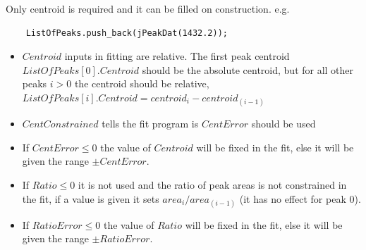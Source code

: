 \documentclass[a4paper,10pt]{article}
\begin{document}
Only centroid is required and it can be filled on construction. e.g.
\lstset{language=C++}
\begin{lstlisting}
	ListOfPeaks.push_back(jPeakDat(1432.2));
\end{lstlisting}

\begin{itemize}
\item $Centroid$ inputs in fitting are relative. The first peak centroid $ListOfPeaks[0].Centroid$ should be the absolute centroid, but for all other peaks $i>0$ the centroid should be relative, \\$ListOfPeaks[i].Centroid = centroid_i - centroid_{(i-1)}$
\item $CentConstrained$ tells the fit program is $CentError$ should be used
\item If $CentError\leq0$ the value of $Centroid$ will be fixed in the fit, else it will be given the range $\pm CentError$.
\item If $Ratio\leq0$ it is not used and the ratio of peak areas is not constrained in the fit, if a value is given it sets $area_i/area_{(i-1)}$ (it has no effect for peak 0).
\item  If $RatioError\leq0$ the value of $Ratio$ will be fixed in the fit, else it will be given the range $\pm RatioError$.
\end{itemize}



\end{document}
